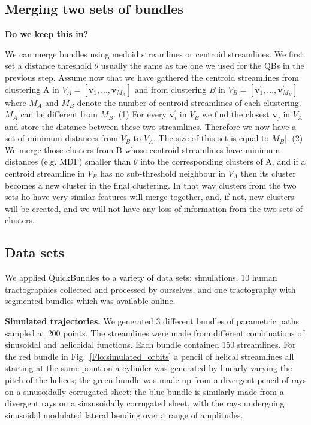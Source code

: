 \documentclass{bioinfo}
\begin{document}
\begin{methods}
\subsection{Merging two sets of bundles\label{sub:merging}}

\textbf{Do we keep this in?}

We can merge bundles using medoid streamlines or centroid
streamlines. We first set a distance threshold $\theta$ usually the same
as the one we used for the QBs in the previous step. Assume now that we
have gathered the centroid streamlines from clustering A in
$V_{A}=[\mathbf{v}_{1},...,\mathbf{v}_{M_{A}}]$ and from clustering $B$
in $V_{B}=[\mathbf{v}_{1}^{'},...,\mathbf{v}_{M_{B}}^{'}]$ where $M_A$
and $M_B$ denote the number of centroid streamlines of each clustering.
$M_{A}$ can be different from $M_{B}$. (1) For every
$\mathbf{v}_{i}^{'}$ in $V_{B}$ we find the closest $\mathbf{v}_{j}$ in
$V_{A}$ and store the distance between these two streamlines. Therefore
we now have a set of minimum distances from $V_{B}$ to $V_{A}$. The size
of this set is equal to $M_{B}|$. (2) We merge those clusters from B
whose centroid streamlines have minimum distances (e.g. MDF) smaller than
$\theta$ into the corresponding clusters of A, and if a centroid
streamline in $V_{B}$ has no sub-threshold neighbour in $V_{A}$ then its
cluster becomes a new cluster in the final clustering. In that way
clusters from the two sets ho have very similar features will merge
together, and, if not, new clusters will be created, and we will not
have any loss of information from the two sets of clusters.

\subsection{\label{sub:QB-Data-sets}Data sets}

We applied QuickBundles to a variety of data sets: simulations, $10$
human tractographies collected and processed by ourselves, and one
tractography with segmented bundles which was available online.

\textbf{Simulated trajectories.} We generated $3$ different bundles of
parametric paths sampled at $200$ points. The streamlines were made from
different combinations of sinusoidal and helicoidal functions.  Each
bundle contained 150 streamlines.  For the red bundle in
Fig.~\ref{Flo:simulated_orbits} a pencil of helical streamlines all
starting at the same point on a cylinder was generated by linearly
varying the pitch of the helices; the green bundle was made up from a
divergent pencil of rays on a sinusoidally corrugated sheet; the blue
bundle is similarly made from a divergent rays on a sinsusoidally
corrugated sheet, with the rays undergoing sinusoidal modulated lateral
bending over a range of amplitudes.


\end{methods}
\end{document}
